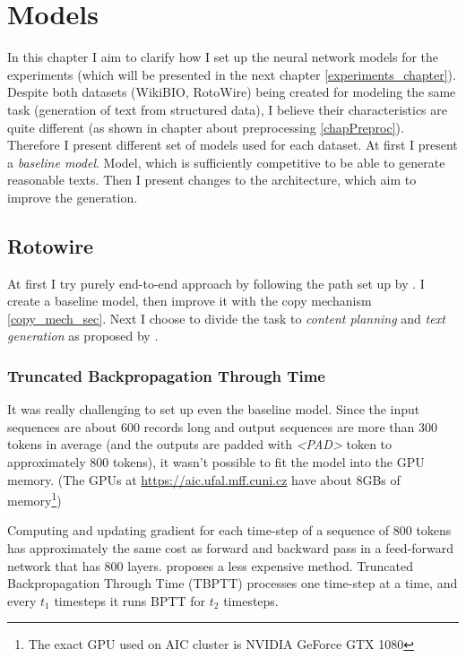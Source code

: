 \chapter{Models}
In this chapter I aim to clarify how I set up the neural network models for the experiments (which will be presented in the next chapter \ref{experiments_chapter}). Despite both datasets (WikiBIO, RotoWire) being created for modeling the same task (generation of text from structured data), I believe their characteristics are quite different (as shown in chapter about preprocessing \ref{chapPreproc}). Therefore I present different set of models used for each dataset. At first I present a \emph{baseline model}. Model, which is sufficiently competitive to be able to generate reasonable texts. Then I present changes to the architecture, which aim to improve the generation.

\section{Rotowire}

At first I try purely end-to-end approach by following the path set up by \citep{wiseman2017}. I create a baseline model, then improve it with the copy mechanism \ref{copy_mech_sec}. Next I choose to divide the task to \emph{content planning} and \emph{text generation} as proposed by \citep{puduppully2019datatotext}.

\subsection{Truncated Backpropagation Through Time}

It was really challenging to set up even the baseline model. Since the input sequences are about 600 records long and output sequences are more than 300 tokens in average (and the outputs are padded with \emph{\textless PAD\textgreater} token to approximately 800 tokens), it wasn't possible to fit the model into the GPU memory. (The GPUs at \url{https://aic.ufal.mff.cuni.cz} have about 8GBs of memory\footnote{The exact GPU used on AIC cluster is NVIDIA GeForce GTX 1080})

Computing and updating gradient for each time-step of a sequence of 800 tokens has approximately the same cost as forward and backward pass in a feed-forward network that has 800 layers. \citep{williamsTBPTT} proposes a less expensive method. Truncated Backpropagation Through Time (TBPTT) processes one time-step at a time, and every $t_1$ timesteps it runs BPTT for $t_2$ timesteps.

